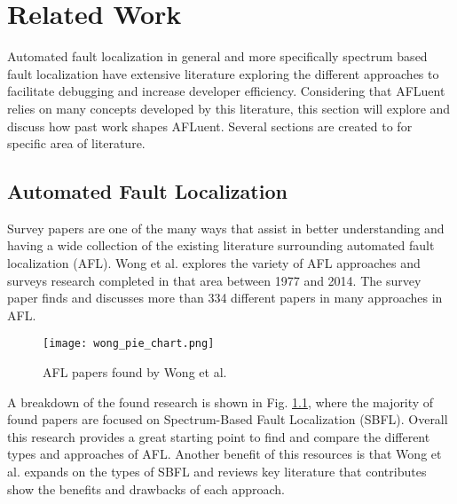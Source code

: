 \chapter{Related Work} 
\label{ch:relatedwork}


Automated fault localization in general and more specifically spectrum based
fault localization have extensive literature exploring the different approaches
to facilitate debugging and increase developer efficiency. Considering that
AFLuent relies on many concepts developed by this literature, this section will
explore and discuss how past work shapes AFLuent. Several sections are created
to for specific area of literature.

\section{Automated Fault Localization}
\label{sec:AFLlit}

Survey papers are one of the many ways that assist in better
understanding and having a wide collection of the existing
literature surrounding automated fault localization (AFL).
Wong et al. \cite{wong2016survey} explores the variety of AFL approaches and
surveys research completed in that area between 1977 and 2014. The survey paper finds and
discusses more than 334 different papers in many approaches in AFL.
\begin{figure}[!htb]
	\begin{center}
		\texttt{[image: wong\_pie\_chart.png]}
		\caption{\label{fig:wong_breakdown} AFL papers found by Wong et al. \cite{wong2016survey}}
	\end{center}
\end{figure}

A breakdown of the found research is shown in Fig. \ref{fig:wong_breakdown}, where the
majority of found papers are focused on Spectrum-Based Fault Localization (SBFL).
Overall this research provides a great
starting point to find and compare the different types and approaches of AFL.
Another benefit of this resources is that
Wong et al. \cite{wong2016survey} expands on the types of SBFL
and reviews key literature that contributes show the benefits and drawbacks of
each approach.

